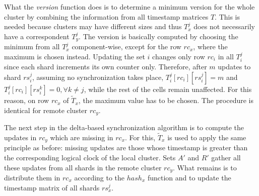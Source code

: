 What the \textit{version} function does is to determine a minimum version for
the whole cluster by combining the information from all timestamp matrices $T$.
This is needed because clusters may have different sizes and thus $T_{x}^{j}$
does not necessarily have a correspondent $T_{y}^{j}$. The version is basically
computed by choosing the minimum from all $T_{x}^{j}$ component-wise, except for
the row $rc_{x}$, where the maximum is chosen instead. Updating the set $i$
changes only row $rc_{i}$ in all $T_{i}^{j}$ since each shard increments its own
counter only. Therefore, after $m$ updates to shard $rs_{i}^{j}$, assuming no
synchronization takes place, $T_{i}^{j}[rc_{i}][rs_{i}^{j}] = m$ and
$T_{i}^{j}[rc_{i}][rs_{i}^{k}] = 0, \forall k \ne j$, while the rest of the
cells remain unaffected. For this reason, on row $rc_{x}$ of $\tilde{T}_{x}$,
the maximum value has to be chosen. The procedure is identical for remote
cluster $rc_{y}$.

The next step in the delta-based synchronization algorithm is to compute the
updates in $rc_{y}$ which are missing in $rc_{x}$. For this, $\tilde{T}_{x}$
is used to apply the same principle as before: missing updates are those whose
timestamp is greater than the corresponding logical clock of the local cluster.
Sets $A'$ and $R'$ gather all these updates from all shards in the remote
cluster $rc_{y}$. What remains is to distribute them in $rc_{x}$ according to
the $hash_{x}$ function and to update the timestamp matrix of all shards
$rs_{x}^{j}$.

